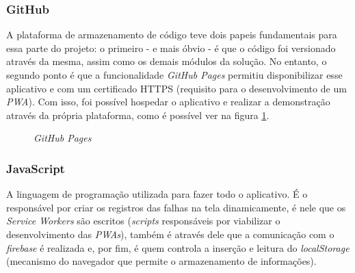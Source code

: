 \subsubsection{GitHub}
\label{subsubsec:github}

A plataforma de armazenamento de código teve dois papeis fundamentais para essa parte do projeto: o primeiro - e mais óbvio - é que o código foi versionado através da mesma, assim como os demais módulos da solução. No entanto, o segundo ponto é que a funcionalidade \textit{GitHub Pages} permitiu disponibilizar esse aplicativo \online{} e com um certificado HTTPS (requisito para o desenvolvimento de um \textit{PWA}). Com isso, foi possível hospedar o aplicativo e realizar a demonstração através da própria plataforma, como é possível ver na figura \ref{fig:github_pages}.

\begin{figure}[H]
    \centering
    \caption{\textit{GitHub Pages}}
    \label{fig:github_pages}
\end{figure}


\subsubsection{JavaScript}
\label{subsubsec:javascript}

A linguagem de programação utilizada para fazer todo o aplicativo. É o responsável por criar os registros das falhas na tela dinamicamente, é nele que os \textit{Service Workers} são escritos (\textit{scripts} responsáveis por viabilizar o desenvolvimento das \textit{PWAs}), também é através dele que a comunicação com o \textit{firebase} é realizada e, por fim, é quem controla a inserção e leitura do \textit{localStorage} (mecanismo do navegador que permite o armazenamento de informações).

